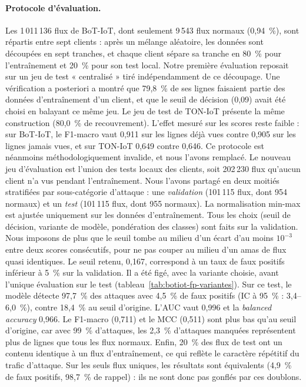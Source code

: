 
\paragraph{Protocole d'évaluation.}
Les 1\,011\,136 flux de BoT-IoT, dont seulement 9\,543 flux normaux (0,94~\%), sont répartis
entre sept clients : après un mélange aléatoire, les données sont découpées en sept tranches,
et chaque client sépare sa tranche en 80~\% pour l'entraînement et 20~\% pour son test local.
Notre première évaluation reposait sur un jeu de test « centralisé » tiré indépendamment de ce
découpage. Une vérification a posteriori a montré que 79,8~\% de ses lignes faisaient partie
des données d'entraînement d'un client, et que le seuil de décision (0,09) avait été choisi en
balayant ce même jeu. Le jeu de test de TON-IoT présente la même construction (80,0~\% de
recouvrement). L'effet mesuré sur les scores reste faible : sur BoT-IoT, le F1-macro vaut
0,911 sur les lignes déjà vues contre 0,905 sur les lignes jamais vues, et sur TON-IoT 0,649
contre 0,646. Ce protocole est néanmoins méthodologiquement invalide, et nous l'avons
remplacé. Le nouveau jeu d'évaluation est l'union des tests locaux des clients, soit
202\,230 flux qu'aucun client n'a vus pendant l'entraînement. Nous l'avons partagé en deux
moitiés stratifiées par sous-catégorie d'attaque : une \emph{validation} (101\,115 flux, dont
954 normaux) et un \emph{test} (101\,115 flux, dont 955 normaux). La normalisation min-max est
ajustée uniquement sur les données d'entraînement. Tous les choix (seuil de décision, variante
de modèle, pondération des classes) sont faits sur la validation. Nous imposons de plus que le
seuil tombe au milieu d'un écart d'au moins $10^{-3}$ entre deux scores consécutifs, pour ne
pas couper au milieu d'un amas de flux quasi identiques. Le seuil retenu, 0,167, correspond à
un taux de faux positifs inférieur à 5~\% sur la validation. Il a été figé, avec la variante
choisie, avant l'unique évaluation sur le test (tableau~\ref{tab:botiot-fp-variantes}). Sur ce
test, le modèle détecte 97,7~\% des attaques avec 4,5~\% de faux positifs (IC à 95~\% :
3,4--6,0~\%), contre 18,4~\% au seuil d'origine. L'AUC vaut 0,996 et la \emph{balanced
accuracy} 0,966. Le F1-macro (0,711) et le MCC (0,511) sont plus bas qu'au seuil d'origine, car
avec 99~\% d'attaques, les 2,3~\% d'attaques manquées représentent plus de lignes que tous
les flux normaux. Enfin, 20~\% des flux de test ont un contenu identique à un flux
d'entraînement, ce qui reflète le caractère répétitif du trafic d'attaque. Sur les seuls flux
uniques, les résultats sont équivalents (4,9~\% de faux positifs, 98,7~\% de rappel) : ils ne
sont donc pas gonflés par ces doublons.

